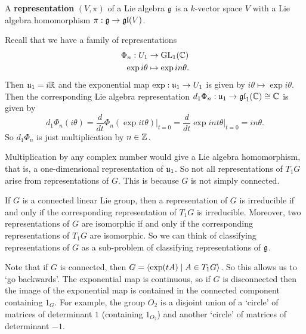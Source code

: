 \begin{defn}
  A \textbf{representation} $(V,\pi)$ of a Lie algebra $\mathfrak{g}$ is a $k$-vector space $V$ with a Lie algebra homomorphism $\pi: \mathfrak{g} \to \operatorname{\mathfrak{gl}}(V)$.
\end{defn}

\begin{exam}
  Recall that we have a family of representations
  \begin{align*}
    \Phi_n: U_1 &\to \operatorname{GL}_1(\mathbb{C}) \\
    \exp i\theta &\mapsto \exp in\theta.
  \end{align*}
  Then $\mathfrak{u}_1 = i\mathbb{R}$ and the exponential map $\exp: \mathfrak{u}_1 \to U_1$ is given by $i\theta \mapsto \exp i\theta$.
  Then the corresponding Lie algebra representation $d_1\Phi_n: \mathfrak{u}_1 \to \operatorname{\mathfrak{gl}}_1(\mathbb{C}) \cong \mathbb{C}$ is given by
  \[ d_1\Phi_n(i\theta) = \frac{d}{dt} \Phi_n(\exp it\theta) \Big\vert_{t=0} = \frac{d}{dt} \exp int\theta \Big\vert_{t=0} = in\theta. \]
  So $d_1\Phi_n$ is just multiplication by $n \in \mathbb{Z}$.
\end{exam}

\begin{rmk}
  Multiplication by any complex number would give a Lie algebra homomorphism, that is, a one-dimensional representation of $\mathfrak{u}_1$.
  So not all representations of $T_1G$ arise from representations of $G$.
  This is because $G$ is not simply connected.
\end{rmk}

\begin{rmk}
  If $G$ is a connected linear Lie group, then a representation of $G$ is irreducible if and only if the corresponding representation of $T_1G$ is irreducible.
  Moreover, two representations of $G$ are isomorphic if and only if the corresponding representations of $T_1G$ are isomorphic.
  So we can think of classifying representations of $G$ as a sub-problem of classifying representations of $\mathfrak{g}$.
\end{rmk}

\begin{rmk}
  Note that if $G$ is connected, then $G = {\left\langle  \exp(tA) \mid A \in T_1G  \right\rangle}$.
  So this allows us to `go backwards'.
  The exponential map is continuous, so if $G$ is disconnected then the image of the exponential map is contained in the connected component containing $1_G$.
  For example, the group $O_2$ is a disjoint union of a `circle' of matrices of determinant $1$ (containing $1_{O_2}$) and another `circle' of matrices of determinant $-1$.
\end{rmk}

